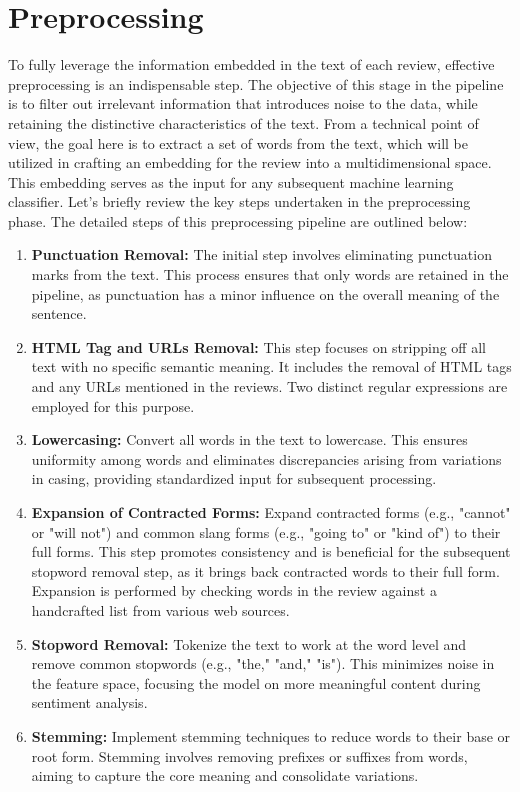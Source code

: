 \section{Preprocessing}

To fully leverage the information embedded in the text of each review, effective preprocessing is an indispensable step. The objective of this stage in the pipeline is to filter out irrelevant information that introduces noise to the data, while retaining the distinctive characteristics of the text. From a technical point of view, the goal here is to extract a set of words from the text, which will be utilized in crafting an embedding for the review into a multidimensional space. This embedding serves as the input for any subsequent machine learning classifier. Let's briefly review the key steps undertaken in the preprocessing phase. The detailed steps of this preprocessing pipeline are outlined below:


\begin{enumerate}

    \item \textbf{Punctuation Removal:} The initial step involves eliminating punctuation marks from the text. This process ensures that only words are retained in the pipeline, as punctuation has a minor influence on the overall meaning of the sentence.

    \item \textbf{HTML Tag and URLs Removal:} This step focuses on stripping off all text with no specific semantic meaning. It includes the removal of HTML tags and any URLs mentioned in the reviews. Two distinct regular expressions are employed for this purpose.

    \item \textbf{Lowercasing:} Convert all words in the text to lowercase. This ensures uniformity among words and eliminates discrepancies arising from variations in casing, providing standardized input for subsequent processing.

    \item \textbf{Expansion of Contracted Forms:} 
    Expand contracted forms (e.g., "cannot" or "will not") and common slang forms (e.g., "going to" or "kind of") to their full forms. This step promotes consistency and is beneficial for the subsequent stopword removal step, as it brings back contracted words to their full form. Expansion is performed by checking words in the review against a handcrafted list from various web sources.

    \item \textbf{Stopword Removal:} Tokenize the text to work at the word level and remove common stopwords (e.g., "the," "and," "is"). This minimizes noise in the feature space, focusing the model on more meaningful content during sentiment analysis.

    \item \textbf{Stemming:} Implement stemming techniques to reduce words to their base or root form. Stemming involves removing prefixes or suffixes from words, aiming to capture the core meaning and consolidate variations. 

\end{enumerate}

